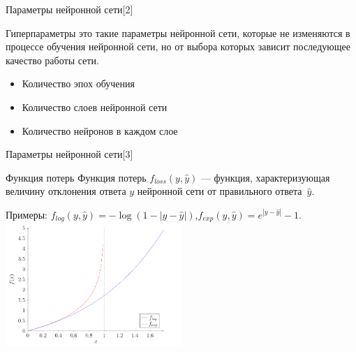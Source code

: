 \documentclass{beamer}
\begin{document}
\begin{frame}{Параметры нейронной сети[2]}
\begin{block}{Гиперпараметры}
это такие параметры нейронной сети, которые не изменяются в процессе обучения нейронной сети, но от выбора которых зависит последующее качество работы сети.
\end{block}

\pause
\begin{block}{}
 \begin{itemize}
  \item Количество эпох обучения
  \item Количество слоев нейронной сети
  \item Количество нейронов в каждом слое
  \end{itemize}
\end{block}


\end{frame}




\begin{frame}{Параметры нейронной сети[3]}
\begin{block}{Функция потерь}  
Функция потерь $f_{loss}(y, \hat{y})$ --- функция, характеризующая величину отклонения ответа $y$ нейронной сети от правильного ответа~$\hat{y}$.
\end{block}
\pause

 \begin{center}
Примеры: \quad $f_{log}(y, \hat{y}) = -\log(1 - |y-\hat{y}|)$,\qquad $f_{exp}(y, \hat{y}) = e^{|y-\hat{y}|} - 1$.
  \includegraphics[width=0.5\textwidth]{losses_graphics.png}
 \end{center}

\end{frame}
\end{document}
